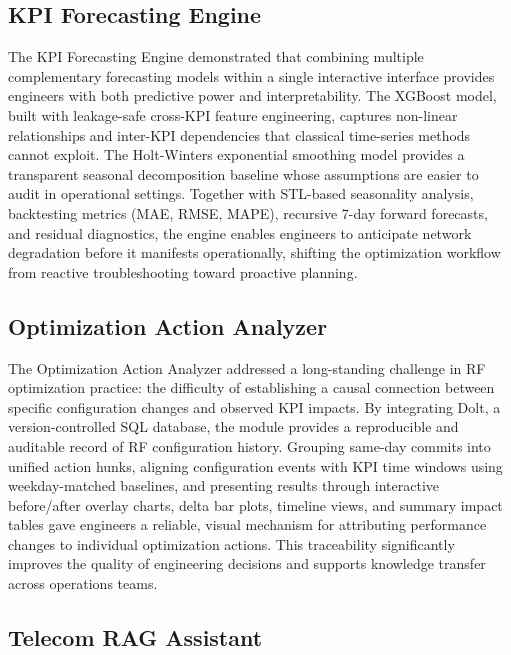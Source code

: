 \subsection*{KPI Forecasting Engine}

The KPI Forecasting Engine demonstrated that combining multiple complementary forecasting models within a single interactive interface provides engineers with both predictive power and interpretability. The XGBoost model, built with leakage-safe cross-KPI feature engineering, captures non-linear relationships and inter-KPI dependencies that classical time-series methods cannot exploit. The Holt-Winters exponential smoothing model provides a transparent seasonal decomposition baseline whose assumptions are easier to audit in operational settings. Together with STL-based seasonality analysis, backtesting metrics (MAE, RMSE, MAPE), recursive 7-day forward forecasts, and residual diagnostics, the engine enables engineers to anticipate network degradation before it manifests operationally, shifting the optimization workflow from reactive troubleshooting toward proactive planning.

\subsection*{Optimization Action Analyzer}

The Optimization Action Analyzer addressed a long-standing challenge in RF optimization practice: the difficulty of establishing a causal connection between specific configuration changes and observed KPI impacts. By integrating Dolt, a version-controlled SQL database, the module provides a reproducible and auditable record of RF configuration history. Grouping same-day commits into unified action hunks, aligning configuration events with KPI time windows using weekday-matched baselines, and presenting results through interactive before/after overlay charts, delta bar plots, timeline views, and summary impact tables gave engineers a reliable, visual mechanism for attributing performance changes to individual optimization actions. This traceability significantly improves the quality of engineering decisions and supports knowledge transfer across operations teams.

\subsection*{Telecom RAG Assistant}

